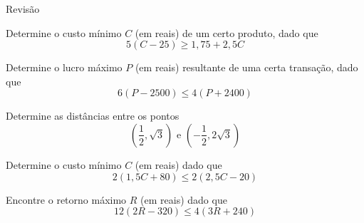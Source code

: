 
\begin{exercicios}{Revisão}

    \begin{exercicio}
        Determine o custo mínimo $C$ (em reais) de um certo produto, dado que
        \[5 (C - 25) \geq 1,75 + 2,5C\]	
    \end{exercicio}
    
    \begin{exercicio}
        Determine o lucro máximo $P$ (em reais) resultante de uma certa transação, dado que
        \[6 (P - 2500) \leq 4 (P + 2400)\]	
    \end{exercicio}
        
    \begin{exercicio}
        Determine as distâncias entre os pontos
        \[\left(\frac{1}{2}, \sqrt{3}\right) \text{ e } \left(- \frac{1}{2}, 2 \sqrt{3}\right)\] 				
    \end{exercicio}
    
    \begin{exercicio}
        Determine o custo mínimo $C$ (em reais) dado que
        \[2 (1,5C + 80) \leq 2 (2,5C - 20)\]
    \end{exercicio}
    
    \begin{exercicio}
        Encontre o retorno máximo $R$ (em reais) dado que
        \[12 (2R - 320) \leq 4 (3R + 240)\]
    \end{exercicio}
    
\end{exercicios}

